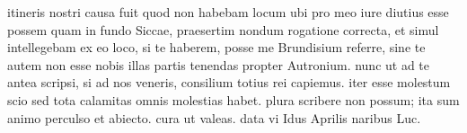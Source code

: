 


itineris nostri causa fuit quod non habebam locum ubi pro meo iure diutius
            esse possem quam in fundo Siccae, praesertim nondum rogatione correcta, et
            simul intellegebam ex eo loco, si te haberem, posse me Brundisium referre,
            sine te autem non esse nobis illas partis tenendas propter Autronium. nunc ut ad te antea scripsi, si ad nos veneris, consilium totius rei
            capiemus. iter esse molestum scio sed tota calamitas omnis molestias habet. plura scribere non possum; ita sum animo perculso et abiecto. cura ut valeas. data vi Idus Aprilis naribus Luc.
